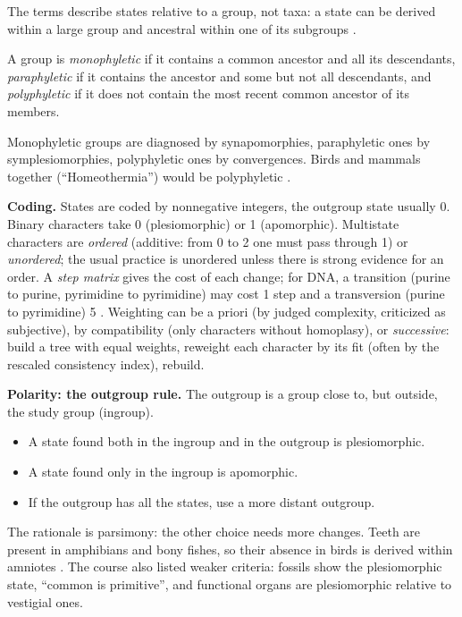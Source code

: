 The terms describe states relative to a
group, not taxa: a state can be derived
within a large group and ancestral within
one of its subgroups
\cite[Chapter 2]{simpson2006plant}.

\begin{definition}
\label{definition-monophyly}
A group is \emph{monophyletic} if it
contains a common ancestor and all its
descendants, \emph{paraphyletic} if it
contains the ancestor and some but not all
descendants, and \emph{polyphyletic} if it
does not contain the most recent common
ancestor of its members.
\end{definition}

Monophyletic groups are diagnosed by
synapomorphies, paraphyletic ones by
symplesiomorphies, polyphyletic ones by
convergences. Birds and mammals together
(``Homeothermia'') would be polyphyletic
\cite[Chapter 4]{hickman2002animal}.

\textbf{Coding.} States are coded by
nonnegative integers, the outgroup state
usually 0. Binary characters take 0
(plesiomorphic) or 1 (apomorphic).
Multistate characters are \emph{ordered}
(additive: from 0 to 2 one must pass
through 1) or \emph{unordered}; the usual
practice is unordered unless there is
strong evidence for an order. A
\emph{step matrix} gives the cost of each
change; for DNA, a transition (purine to
purine, pyrimidine to pyrimidine) may cost
1 step and a transversion (purine to
pyrimidine) 5
\cite[Chapter 2]{simpson2006plant}.
Weighting can be a priori (by judged
complexity, criticized as subjective),
by compatibility (only characters without
homoplasy), or \emph{successive}: build a
tree with equal weights, reweight each
character by its fit (often by the
rescaled consistency index), rebuild.

\textbf{Polarity: the outgroup rule.} The
outgroup is a group close to, but outside,
the study group (ingroup).
\begin{itemize}
\item A state found both in the ingroup and
in the outgroup is plesiomorphic.
\item A state found only in the ingroup is
apomorphic.
\item If the outgroup has all the states,
use a more distant outgroup.
\end{itemize}
The rationale is parsimony: the other
choice needs more changes. Teeth are
present in amphibians and bony fishes, so
their absence in birds is derived within
amniotes \cite[Chapter 4]{hickman2002animal}.
The course also listed weaker criteria:
fossils show the plesiomorphic state,
``common is primitive'', and functional
organs are plesiomorphic relative to
vestigial ones.

